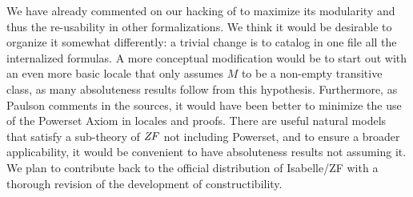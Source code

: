 We have already commented on our hacking of 
to maximize its modularity and thus the re-usability in other
formalizations. We think it would be desirable to organize it
somewhat differently: a trivial change is to catalog in one file all
the internalized formulas. A more
conceptual modification would be to start out with an even more basic
locale that only assumes $M$ to be a non-empty transitive class, as
many absoluteness results follow from this hypothesis. Furthermore, as
Paulson comments in the 
sources, it would have been better to minimize the use of the Powerset
Axiom in locales and proofs. There are useful natural models that
satisfy a sub-theory of $\mathit{ZF}$ not including Powerset, and to ensure a
broader applicability, it would be convenient to have absoluteness
results not assuming it. We plan to contribute back to the official
distribution of Isabelle/ZF with a thorough revision of the development of
constructibility.



